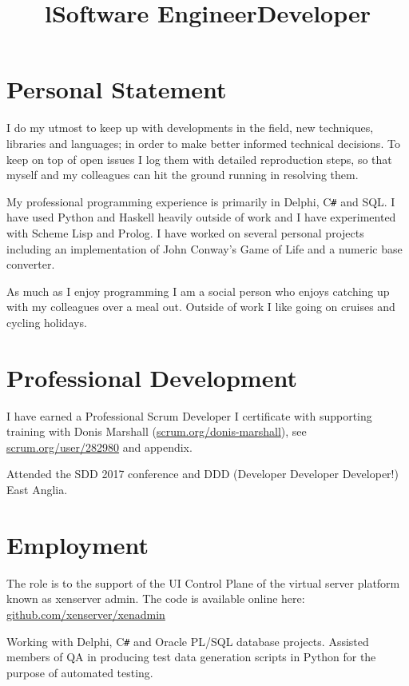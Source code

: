 \documentclass[line,margin]{res}
\title{l} \location{r} \\
\newcommand{\CSharp}{C\texttt{\#}}
\begin{document}
\begin{resume}

\section{Personal Statement}
I do my utmost to keep up with developments in the field,
new techniques, libraries and languages;
in order to make better informed technical decisions.
To keep on top of open issues I log them with detailed reproduction steps,
so that myself and my colleagues can hit the ground running in resolving them.

My professional programming experience is primarily in
Delphi, {\CSharp} and SQL.
I have used Python and Haskell heavily outside of work and
I have experimented with Scheme Lisp and Prolog.
I have worked on several personal projects including an implementation of
John Conway's Game of Life and a numeric base converter.

As much as I enjoy programming I am a social person who enjoys catching up with
my colleagues over a meal out.
Outside of work I like going on cruises and cycling holidays.

\section{Professional Development}
I have earned a Professional Scrum Developer I certificate with supporting
training with Donis Marshall
(\href{https://www.scrum.org/donis-marshall}{scrum.org/donis-marshall}), see
\href{https://www.scrum.org/user/282980}{scrum.org/user/282980} and appendix.

Attended the SDD 2017 conference and
DDD (Developer Developer Developer!) East Anglia.

\section{Employment}

\title{Software Engineer}
\begin{position}
The role is to the support of the UI Control Plane
of the virtual server platform known as xenserver admin.
The code is available online here:
\href{https://github.com/xenserver/xenadmin}{github.com/xenserver/xenadmin}
\end{position}

\title{Developer}
\begin{position}
Working with Delphi, {\CSharp} and Oracle PL/SQL database projects.
Assisted members of QA in producing test data generation scripts in Python
for the purpose of automated testing.


\end{position}
\end{resume}
\end{document}
